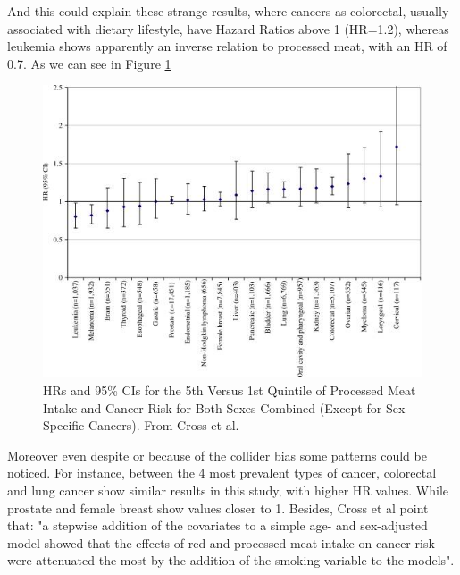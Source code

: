 \documentclass{article}
\begin{document}
And this could explain these strange results, where cancers as colorectal, usually associated with dietary lifestyle, have Hazard Ratios above 1 (HR=1.2), whereas leukemia shows apparently an inverse relation to processed meat, with an HR of 0.7. As we can see in Figure \ref{fig:cross}
\begin{figure}
  \includegraphics[scale=0.75]{tileshop2}
  \caption{HRs and 95\% CIs for the 5th Versus 1st Quintile of Processed Meat Intake and Cancer Risk for Both Sexes Combined (Except for Sex-Specific Cancers). From Cross et al. \cite{cross}}
  \label{fig:cross}
\end{figure}



Moreover even despite or because of the collider bias some patterns could be noticed. For instance, between the 4 most prevalent types of cancer, colorectal and lung cancer show similar results in this study, with higher HR values. While prostate and female breast show values closer to 1. Besides, Cross et al point that: "a stepwise addition of the covariates to a simple age- and sex-adjusted model showed that the effects of red and processed meat intake on cancer risk were attenuated the most by the addition of the smoking variable to the models". %
\end{document}
